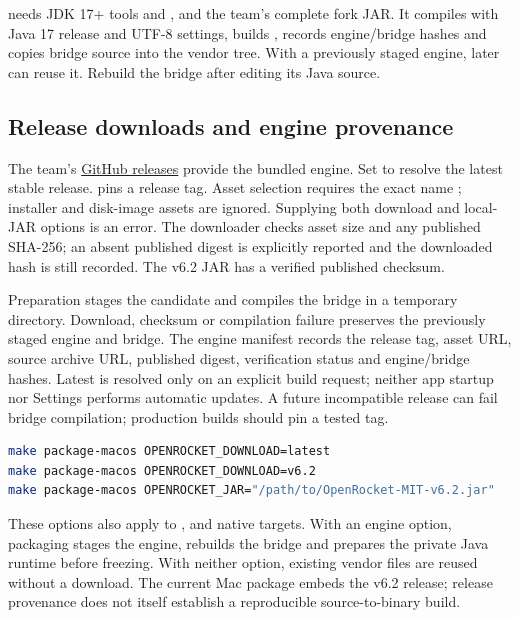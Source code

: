  needs JDK 17+ tools  and , and the team's
complete fork JAR. It compiles with Java 17 release and UTF-8 settings, builds
, records engine/bridge hashes and copies bridge source
into the vendor tree. With a previously staged engine, later 
can reuse it. Rebuild the bridge after editing its Java source.

\subsection{Release downloads and engine provenance}
The team's \href{https://github.com/MDNich/ActiveControl_MIT_RktTeam/releases}{GitHub releases} provide the bundled engine. Set
 to resolve the latest stable release.
 pins a release tag. Asset selection requires the
exact name ; installer and disk-image assets are
ignored. Supplying both download and local-JAR options is an error.
The downloader checks asset size and any published SHA-256; an absent published
digest is explicitly reported and the downloaded hash is still recorded.
The v6.2 JAR has a verified published checksum.

Preparation stages the candidate and compiles the bridge in a temporary
directory. Download, checksum or compilation failure preserves the previously
staged engine and bridge. The engine manifest records the release tag, asset
URL, source archive URL, published digest, verification status and engine/bridge
hashes. Latest is resolved only on an explicit build request; neither app
startup nor Settings performs automatic updates. A future incompatible release
can fail bridge compilation; production builds should pin a tested tag.

\begin{lstlisting}[language=bash]
make package-macos OPENROCKET_DOWNLOAD=latest
make package-macos OPENROCKET_DOWNLOAD=v6.2
make package-macos OPENROCKET_JAR="/path/to/OpenRocket-MIT-v6.2.jar"
\end{lstlisting}
These options also apply to ,  and native
 targets. With an engine option, packaging stages the engine, rebuilds
the bridge and prepares the private Java runtime before freezing. With neither
option, existing vendor files are reused without a download. The current Mac
package embeds the v6.2 release; release provenance does not itself establish a
reproducible source-to-binary build.

